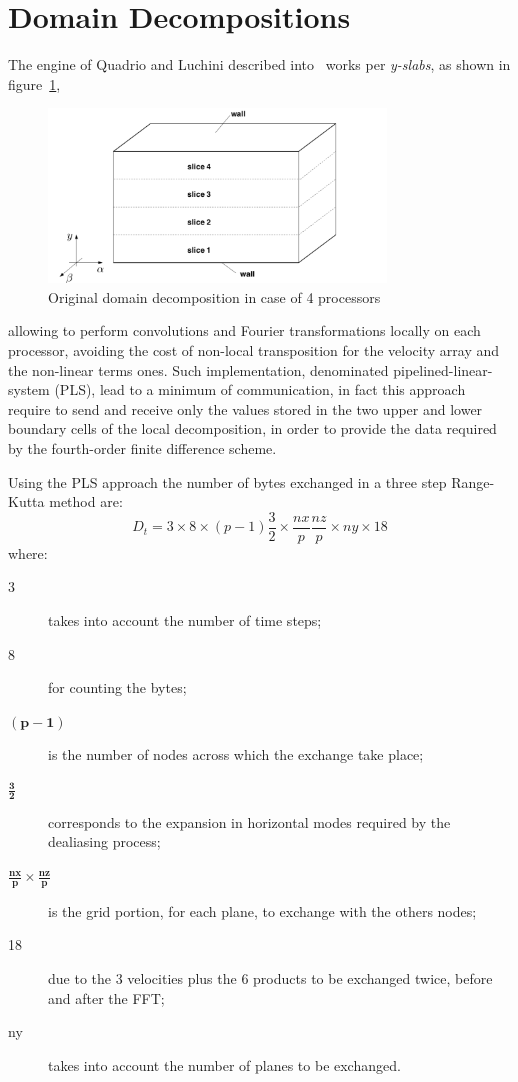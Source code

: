 \section{Domain Decompositions}
The engine of Quadrio and Luchini described into~\cite{cpl:presentazione} works per \emph{y-slabs}, as shown in figure~\ref{domain_decomp},
\begin{figure}
\centering
\includegraphics[width=0.8\textwidth]{grafici/decomp_dominio_cpl}
\caption{Original domain decomposition in case of 4 processors}
\label{domain_decomp}
\end{figure}
 allowing to perform convolutions and Fourier transformations locally on each processor, avoiding the cost of non-local transposition for the velocity array and the non-linear terms ones. Such implementation, denominated pipelined-linear-system (PLS), lead to a minimum of communication, in fact this approach require to send and receive only the values stored in the two upper and lower boundary cells of the local decomposition, in order to provide the data required by the fourth-order finite difference scheme.
 \par
 Using the PLS approach the number of bytes exchanged in a three step Range-Kutta method are:
 \begin{equation}
 D_{t} = 3 \times 8 \times (p-1) \frac{3}{2} \times \frac{nx}{p} \frac{nz}{p} \times ny \times 18
 \label{exchange:data:cpl}
 \end{equation}
 where:
 \begin{description}
  \item[3] takes into account the number of time steps;
  \item[8] for counting the bytes;
  \item[$\mathbf{(p-1)}$] is the number of nodes across which the exchange take place;
  \item[ $\mathbf{\frac{3}{2}}$ ] corresponds to the expansion in horizontal modes required by the dealiasing process;
  \item[ $\mathbf{\frac{nx}{p} \times \frac{nz}{p}}$] is the grid portion, for each plane, to exchange with the others nodes;
  \item[18] due to the 3 velocities plus the 6 products to be exchanged twice, before and after the FFT;
  \item[ny] takes into account the number of planes to be exchanged.
\end{description}

